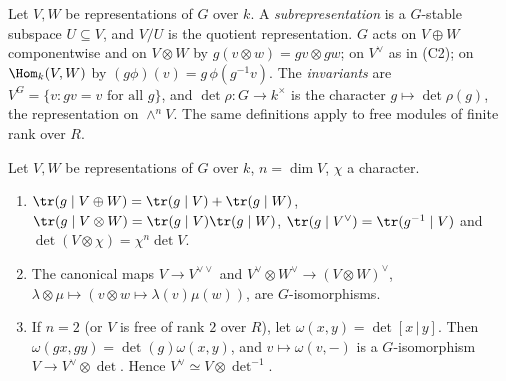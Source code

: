 \begin{definition}[Constructions]\label{def:reps:constructions}
Let $V,W$ be representations of $G$ over $k$.
A \emph{subrepresentation} is a $G$-stable subspace $U\subseteq V$, and $V/U$ is the quotient representation. $G$ acts on $V\oplus W$
componentwise and on $V\otimes W$ by $g(v\otimes w)=gv\otimes gw$; on $V^\vee$ as in (C2); on $\Hom_k(V,W)$ by $(g\phi)(v)=g\,\phi(g^{-1}v)$.
The \emph{invariants} are $V^G=\{v:gv=v\text{ for all }g\}$, and $\det\rho\colon G\to k^\times$ is the character $g\mapsto\det\rho(g)$, the
representation on $\wedge^nV$. The same definitions apply to free modules of finite rank over $R$.
\end{definition}

\begin{proposition}\label{prop:reps:basic-facts}
Let $V,W$ be representations of $G$ over $k$, $n=\dim V$, $\chi$ a character.
\begin{enumerate}[label=(\roman*)]
\item $\tr(g\mid V\oplus W)=\tr(g\mid V)+\tr(g\mid W)$, $\tr(g\mid V\otimes W)=\tr(g\mid V)\tr(g\mid W)$, $\tr(g\mid V^\vee)=\tr(g^{-1}\mid V)$ and
$\det(V\otimes\chi)=\chi^n\det V$.
\item The canonical maps $V\to V^{\vee\vee}$ and $V^\vee\otimes W^\vee\to(V\otimes W)^\vee$, $\lambda\otimes\mu\mapsto(v\otimes w\mapsto\lambda(v)\mu(w))$, are
$G$-isomorphisms.
\item If $n=2$ (or $V$ is free of rank $2$ over $R$), let $\omega(x,y)=\det[x\,|\,y]$. Then $\omega(gx,gy)=\det(g)\omega(x,y)$, and
$v\mapsto\omega(v,{-})$ is a $G$-isomorphism $V\to V^\vee\otimes\det$. Hence $V^\vee\simeq V\otimes\det^{-1}$.
\end{enumerate}
\end{proposition}

